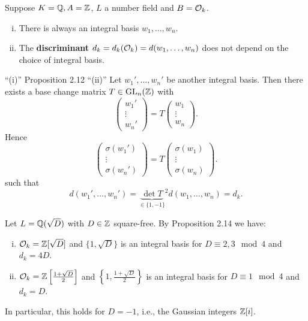 \begin{Bem}
	Suppose $K=\mathbb{Q}, A=\mathbb{Z}$, $L$ a number field and $B=\mathcal{O}_k$.
	\begin{enumerate}[(i)]
		\item There is always an integral basis $w_1, \dots, w_n$.
		\item The \textbf{discriminant} $d_k = d_k(\mathcal{O}_k) = d(w_1, \dots, w_n)$ does not depend on the choice of integral basis.
	\end{enumerate}
\end{Bem}

\begin{Bew}
	\enquote{(i)} Proposition 2.12
	\enquote{(ii)} Let $w_1', \dots, w_n'$ be another integral basis. Then there exists a base change matrix $T \in \operatorname{GL}_n(\mathbb{Z})$ with
	\[ \begin{pmatrix}
		w_1' \\ \vdots \\ w_n'
	\end{pmatrix}
	= T  \begin{pmatrix}
	w_1 \\ \vdots \\ w_n
	\end{pmatrix}.
	\]
	Hence 
		\[ \begin{pmatrix}
		\sigma(w_1') \\ \vdots \\ \sigma(w_n')
		\end{pmatrix}
		= T  \begin{pmatrix}
		\sigma(w_1) \\ \vdots \\ \sigma(w_n)
		\end{pmatrix}.
		\]
	such that
	\[ d(w_1', \dots, w_n') = {\underbrace{\det T}_{ \in \{ 1, -1\} } }^2 d(w_1, \dots, w_n)
	= d_k.
	\]
\end{Bew}

\begin{Bsp}
	Let $L=\mathbb{Q}(\sqrt{D})$ with $D\in\mathbb{Z}$ square-free. By Proposition 2.14 we have:
	\begin{enumerate}[(i)]
		\item $\mathcal{O}_k=\mathbb{Z}[\sqrt{D}]$ and $\{1,\sqrt{D} \}$ is an integral basis for $D \equiv 2,3 \mod 4$ and $d_k = 4D$.
		\item $\mathcal{O}_k=\mathbb{Z}\left[\frac{1+\sqrt{D}}{2}\right]$ and $\left\{1,\frac{1+\sqrt{D}}{2} \right\}$ is an integral basis for $D \equiv 1 \mod 4$ and $d_k = D$.
	\end{enumerate}	
In particular, this holds for $D=-1$, i.e., the Gaussian integers $\mathbb{Z}[i]$.
\end{Bsp}



